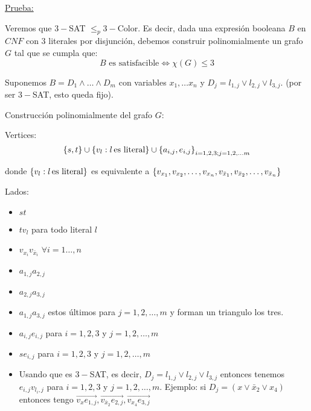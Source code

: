 \documentclass[12pt,a4paper]{article}
\begin{document}
\underline{Prueba:}
\medskip

Veremos que $3-$SAT $\leq_{p} 3-$Color. Es decir, dada una expresión booleana $B$ 
en $CNF$ con $3$ literales por disjunción, debemos construir polinomialmente un grafo 
$G$ tal que se cumpla que:
$$B \text{ es satisfacible} \Leftrightarrow \chi (G) \leq 3$$ 

Suponemos $B = D_{1} \wedge \ldots \wedge D_{m}$ con variables $x_{1}, \ldots x_{n}$ 
y $D_{j} = l_{1,j} \vee l_{2,j} \vee l_{3,j}$. (por ser $3-$SAT, esto queda fijo).
\medskip

Construcción polinomialmente del grafo $G$:
\medskip

Vertices:
$$\left\lbrace s,t \right\rbrace \cup \left\lbrace v_{l}: l\,\text{es literal} \right\rbrace \cup \left\lbrace a_{i,j},e_{i,j} \right\rbrace_{i= 1,2,3; j = 1,2,\ldots m}$$

donde $\left\lbrace v_{l}: l\,\text{es literal} \right\rbrace$ es equivalente a $\left\lbrace v_{x_{1}},v_{x_{2}},\ldots ,v_{x_{n}},v_{\bar{x}_{1}},v_{\bar{x}_{2}},\ldots,v_{\bar{x}_{n}} \right\rbrace$
\medskip

Lados:
\begin{itemize}
    \item $st$
    \item $tv_{l}$ para todo literal $l$
    \item $v_{x_{i}}v_{\bar{x}_{i}}\,\, \forall i=1\ldots,n$
    \item $a_{1,j}a_{2,j}$
    \item $a_{2,j}a_{3,j}$
    \item $a_{1,j}a_{3,j}$ estos últimos para $j = 1,2,\ldots,m$ y forman un 
        triangulo los tres.
    \item $a_{i,j}e_{i,j}$ para $i = 1,2,3$ y $j = 1,2,\ldots,m$
    \item $se_{i,j}$ para $i = 1,2,3$ y $j = 1,2,\ldots,m$
    \item Usando que es $3-$SAT, es decir, $D_{j} = l_{1,j} \vee l_{2,j} \vee l_{3,j}$ 
        entonces tenemos $e_{i,j}v_{l_{i},j}$ para $i = 1,2,3$ y $j = 1,2,\ldots,m$.
        Ejemplo: si $D_{j} = (x \vee \bar{x}_{2}\vee x_{4})$ entonces tengo 
        $\overrightarrow{v_{x}e_{1,j}}, \overrightarrow{v_{\bar{x}_{2}}e_{2,j}}, \overrightarrow{v_{x_{4}}e_{3,j}}$
\end{itemize}
\end{document}
